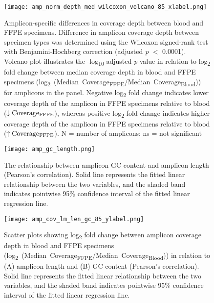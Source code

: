 \begin{figure}[H]
	\centering
	\texttt{[image: amp\_norm\_depth\_med\_wilcoxon\_volcano\_85\_xlabel.png]}
	\caption[Amplicon-specific differences in coverage depth between blood and FFPE specimens.]{Amplicon-specific differences in coverage depth between blood and FFPE specimens. Difference in amplicon coverage depth between specimen types was determined using the Wilcoxon signed-rank test with Benjamini-Hochberg correction (adjusted \textit{p} $<$ 0.0001). Volcano plot illustrates the -log\textsubscript{10} adjusted \textit{p}-value in relation to log\textsubscript{2} fold change between median coverage depth in blood and FFPE specimens (\mbox{log\textsubscript{2} (Median Coverage\textsubscript{FFPE}/Median Coverage\textsubscript{Blood})}) for amplicons in the panel. Negative log\textsubscript{2} fold change indicates lower coverage depth of the amplicon in FFPE specimens relative to blood ($\downarrow \text{Coverage\textsubscript{FFPE}}$), whereas positive log\textsubscript{2} fold change indicates higher coverage depth of the amplicon in FFPE specimens relative to blood ($\uparrow\text{Coverage\textsubscript{FFPE}}$). N = number of amplicons; ns = not significant}
	\label{fig:amp_norm_depth_med_wilcoxon_volcano}
\end{figure}


\begin{figure}[H]
	\centering
	\texttt{[image: amp\_gc\_length.png]}
	\caption[The relationship between amplicon GC content and amplicon length (Pearson's correlation).]{The relationship between amplicon GC content and amplicon length (Pearson's correlation). Solid line represents the fitted linear relationship between the two variables, and the shaded band indicates pointwise 95\% confidence interval of the fitted linear regression line.}
	\label{fig:amp_gc_length}
\end{figure}


\begin{figure}[H]
	\centering
	\texttt{[image: amp\_cov\_lm\_len\_gc\_85\_ylabel.png]}
	\caption[Scatter plots showing log\textsubscript{2} fold change between amplicon coverage depth in blood and FFPE specimens in relation to (A) amplicon length and (B) GC content (Pearson's correlation).]{Scatter plots showing log\textsubscript{2} fold change between amplicon coverage depth in blood and FFPE specimens (\mbox{log\textsubscript{2} (Median Coverage\textsubscript{FFPE}/Median Coverage\textsubscript{Blood})}) in relation to (A) amplicon length and (B) GC content (Pearson's correlation). Solid line represents the fitted linear relationship between the two variables, and the shaded band indicates pointwise 95\% confidence interval of the fitted linear regression line.}
	\label{fig:amp_cov_lm_len_gc}
\end{figure}

